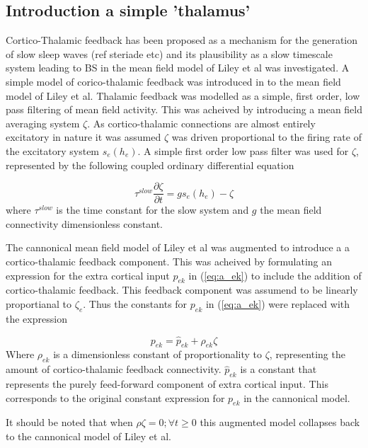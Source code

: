 \documentclass[a4paper,12pt]{article}
\begin{document}
\subsection{Introduction a simple 'thalamus'}

Cortico-Thalamic feedback has been proposed as a mechanism for the generation of slow sleep waves (ref steriade etc) and its plausibility as a slow timescale system leading to BS in the mean field model of Liley et al was investigated. 
A simple model of corico-thalamic feedback was introduced in to the mean field model of Liley et al. Thalamic feedback was modelled as a simple, first order, low pass filtering of mean field activity. This was acheived by introducing a mean field averaging system $\zeta$. As cortico-thalamic connections are almost entirely excitatory in nature it was assumed $\zeta$ was driven proportional to the firing rate of the excitatory system $s_e(h_e)$.
A simple first order low pass filter was used for $\zeta$, represented by the following coupled ordinary differential equation

\begin{equation} \label{eq:zeta_slow} 
\tau^{slow} \frac{\partial \zeta}{\partial t} = g s_e(h_e) - \zeta
\end{equation}
where $\tau^{slow}$ is the time constant for the slow system and $g$ the mean field connectivity
dimensionless constant.

The cannonical mean field model of Liley et al was augmented to introduce a a cortico-thalamic feedback component. 
This was acheived by formulating an expression for the extra cortical input $p_{ek}$ in (\ref{eq:a_ek}) to include the addition of cortico-thalamic feedback. This feedback component was assumend to be linearly proportianal to $\zeta_e$. Thus the constants for $p_{ek}$ in (\ref{eq:a_ek}) were replaced with the expression

\begin{equation} \label{eq:p_ek}
p_{ek} = \hat{p}_{ek} + \rho_{ek} \zeta
\end{equation}
\noindent
Where $\rho_{ek}$ is a dimensionless constant of proportionality to $\zeta$, representing the amount of cortico-thalamic feedback connectivity. $\hat{p}_{ek}$ is a constant that represents
the purely feed-forward component of extra cortical input. This corresponds to the original constant expression for $p_{ek}$ in the cannonical model. 

It should be noted that when $\rho\zeta=0; \forall t \geq 0$ this augmented model collapses back to the cannonical model of Liley et al.
\end{document}
